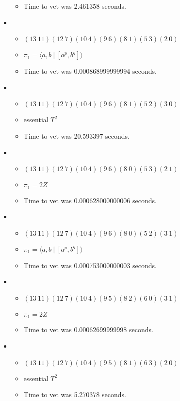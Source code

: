 \documentclass{article}
\begin{document}
\begin{itemize}
\begin{itemize}
      \item Time to vet was 2.461358 seconds.
\end{itemize}
\item \begin{itemize}
      \item $(13\ 11)(12\ 7)(10\ 4)(9\ 6)(8\ 1)(5\ 3)(2\ 0)$
      \item $\pi_1 = \langle a,b\ |\ [a^p,b^q]\rangle$
      \item Time to vet was 0.000868999999994 seconds.
\end{itemize}
\item \begin{itemize}
      \item $(13\ 11)(12\ 7)(10\ 4)(9\ 6)(8\ 1)(5\ 2)(3\ 0)$
      \item essential $T^2$
      \item Time to vet was 20.593397 seconds.
\end{itemize}
\item \begin{itemize}
      \item $(13\ 11)(12\ 7)(10\ 4)(9\ 6)(8\ 0)(5\ 3)(2\ 1)$
      \item $\pi_1 =2 Z$
      \item Time to vet was 0.000628000000006 seconds.
\end{itemize}
\item \begin{itemize}
      \item $(13\ 11)(12\ 7)(10\ 4)(9\ 6)(8\ 0)(5\ 2)(3\ 1)$
      \item $\pi_1 = \langle a,b\ |\ [a^p,b^q]\rangle$
      \item Time to vet was 0.000753000000003 seconds.
\end{itemize}
\item \begin{itemize}
      \item $(13\ 11)(12\ 7)(10\ 4)(9\ 5)(8\ 2)(6\ 0)(3\ 1)$
      \item $\pi_1 =2 Z$
      \item Time to vet was 0.00062699999998 seconds.
\end{itemize}
\item \begin{itemize}
      \item $(13\ 11)(12\ 7)(10\ 4)(9\ 5)(8\ 1)(6\ 3)(2\ 0)$
      \item essential $T^2$
      \item Time to vet was 5.270378 seconds.

\end{itemize}
\end{itemize}
\end{document}
